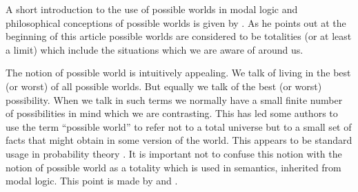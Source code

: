 A short introduction to the
use of possible worlds in modal logic and philosophical conceptions of
possible worlds is given by \cite{Menzel2015}.  As he points out at
the beginning of this article possible worlds are considered to be
totalities (or at least a limit) which include the situations which we
are aware of around us.

The notion of possible world is intuitively appealing.  We talk of
living in the best (or worst) of all possible worlds. But equally we
talk of the best (or worst) possibility.  When we talk in such
terms we normally have a small finite number of possibilities in mind
which we are contrasting.  This has led some authors to use the term
``possible world'' to refer not to a total universe but to a small set
of facts that might obtain in some version of the world.  This appears
to be standard usage in probability theory \citep[e.g.][]{Halpern2003}.  It is
important not to confuse this notion with the notion of possible world
as a totality which is used in semantics, inherited from modal logic.
This point is made by \cite{CooperDobnikLappinLarsson2014a} and \cite{Lappin2015}.

